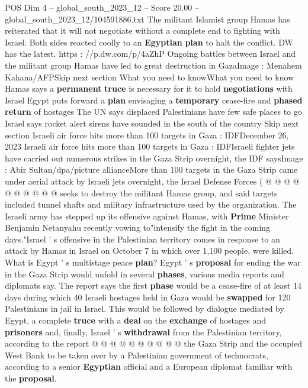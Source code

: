 \begin{textsample}{POS Dim 4 – global\_south\_2023\_12 – Score 20.00 – global\_south\_2023\_12/104591886.txt}  \label{ex:f4_pos_141}
The militant Islamist group Hamas has reiterated that it will not negotiate without a complete end to fighting with Israel.
Both sides reacted coolly to an \textbf{Egyptian} \textbf{plan} to halt the conflict.
DW has the latest. https : //p.dw.com/p/4aZhP Ongoing battles between Israel and the militant group Hamas have led to great destruction in GazaImage : Menahem Kahana/AFPSkip next section What you need to knowWhat you need to know Hamas says a \textbf{permanent} \textbf{truce} is necessary for it to hold \textbf{negotiations} with Israel Egypt puts forward a \textbf{plan} envisaging a \textbf{temporary} cease-fire and \textbf{phased} \textbf{return} of hostages The UN says displaced Palestinians have few safe places to go Israel says rocket alert sirens have sounded in the south of the country Skip next section Israeli air force hits more than 100 targets in Gaza : IDFDecember 26, 2023 Israeli air force hits more than 100 targets in Gaza : IDFIsraeli fighter jets have carried out numerous strikes in the Gaza Strip overnight, the IDF saysImage : Abir Sultan/dpa/picture allianceMore than 100 targets in the Gaza Strip came under aerial attack by Israeli jets overnight, the Israel Defense Forces ( @ @ @ @ @ @ @ @ @ @ seeks to destroy the militant Hamas group, and said targets included tunnel shafts and military infrastructure used by the organization.
The Israeli army has stepped up its offensive against Hamas, with \textbf{Prime} Minister Benjamin Netanyahu recently vowing to"intensify the fight in the coming days."Israel ' s offensive in the Palestinian territory comes in response to an attack by Hamas in Israel on October 7 in which over 1,100 people, were killed.
What is Egypt ' s multistage peace \textbf{plan}?
Egypt ' s \textbf{proposal} for ending the war in the Gaza Strip would unfold in several \textbf{phases}, various media reports and diplomats say.
The report says the first \textbf{phase} would be a cease-fire of at least 14 days during which 40 Israeli hostages held in Gaza would be \textbf{swapped} for 120 Palestinians in jail in Israel.
This would be followed by dialogue mediated by Egypt, a complete \textbf{truce} with a \textbf{deal} on the \textbf{exchange} of hostages and \textbf{prisoners} and, finally, Israel ' s \textbf{withdrawal} from the Palestinian territory, according to the report @ @ @ @ @ @ @ @ @ @ the Gaza Strip and the occupied West Bank to be taken over by a Palestinian government of technocrats, according to a senior \textbf{Egyptian} official and a European diplomat familiar with the \textbf{proposal}.

\end{textsample}
